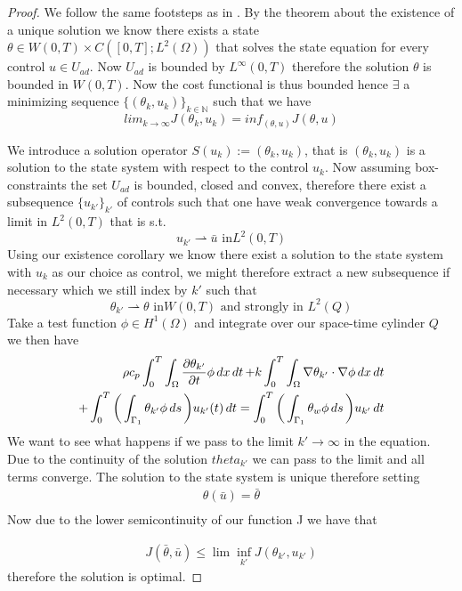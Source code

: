 \begin{proof}
We follow the same footsteps as in  \cite{DPSteel}. By the theorem about the existence of a unique solution we know there exists a state $\theta \in W(0,T) \times C([0,T];L^2(\Omega))$ that solves the state equation for every control $u \in U_{ad}$. Now $U_{ad}$ is bounded by $L^{\infty}(0,T)$ therefore the solution $\theta$ is bounded in $W(0,T)$. Now the cost functional is thus bounded hence $\exists$ a minimizing sequence $\{(\theta_k,u_k)\}_{k\in \mathbb{N}}$ such that we have 
\begin{equation*}
    lim_{k\rightarrow \infty}J(\theta_k,u_k) = inf_{(\theta,u)}J(\theta,u)
\end{equation*}

We introduce a solution operator $S(u_k):= (\theta_k, u_k)$, that is $(\theta_k,u_k)$ is a solution to the state system with respect to the control $u_k$. Now assuming box-constraints the set $U_{ad}$ is bounded, closed and convex, therefore there exist a subsequence $\{u_{k'} \}_{k'}$ of controls such that one have weak convergence towards a limit in $L^2(0,T)$ that is s.t.
\begin{equation*}
    u_{k'} \rightharpoonup \bar{u} \text{ in} L^2(0,T)
\end{equation*}
Using our existence corollary we know there exist a solution to the state system with $u_k$ as our choice as control, we might therefore extract a new subsequence if necessary which we still index by $k'$ such that
\begin{equation*}
    \theta_{k'} \rightharpoonup \theta \text{ in} W(0,T) \text{ and strongly in } L^2(Q)
\end{equation*}
Take a test function $\phi \in H^1(\Omega)$ and integrate over our space-time cylinder $Q$ we then have 
\begin{align*}
    \rho c_p \int_0^T\int_{\Omega}\frac{\partial \theta_{k'}}{\partial t}\phi \mathop{dx}\mathop{dt} + k \int_0^T \int_{\Omega}\nabla \theta_{k'} \cdot \nabla \phi \mathop{dx}\mathop{dt} \\ + \int_0^T \bigg (\int_{\Gamma_1}\theta_{k'}\phi \mathop{ds} \bigg )u_{k'}(t) \mathop{dt} =
    \int_0^T \bigg (\int_{\Gamma_1}\theta_w\phi \mathop{ds} \bigg ) u_{k'} \mathop{dt} 
\end{align*}
We want to see what happens if we pass to the limit $k' \rightarrow \infty$ in the equation. Due to the continuity of the solution $theta_{k'}$ we can pass to the limit and all terms converge. The solution to the state system is unique therefore setting
\begin{align*}
    \theta(\bar{u}) = \bar{\theta} \\
\end{align*}
Now due to the lower semicontinuity of our function J we have that 

\begin{align*}
    J(\bar{\theta}, \bar{u}) \leq \lim \inf_{k'} J(\theta_{k'}, u_{k'})
\end{align*}
therefore the solution is optimal. 
\end{proof}